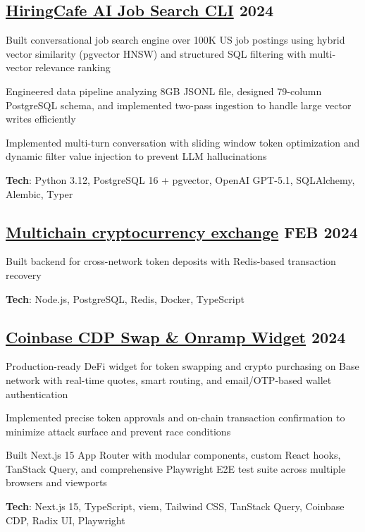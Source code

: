 \documentclass[letter,10pt]{article}
\begin{document}
\subsection{{ \href{https://github.com/Suhel-Kap/hiringcafe-dataset-job-search}{HiringCafe AI Job Search CLI} \hfill 2024}}
\begin{zitemize}
  \item Built conversational job search engine over 100K US job postings using hybrid vector similarity (pgvector HNSW) and structured SQL filtering with multi-vector relevance ranking
  \item Engineered data pipeline analyzing 8GB JSONL file, designed 79-column PostgreSQL schema, and implemented two-pass ingestion to handle large vector writes efficiently
  \item Implemented multi-turn conversation with sliding window token optimization and dynamic filter value injection to prevent LLM hallucinations
  \item \textbf{Tech}: Python 3.12, PostgreSQL 16 + pgvector, OpenAI GPT-5.1, SQLAlchemy, Alembic, Typer
\end{zitemize}

\subsection{{ \href{https://github.com/Suhel-Kap/crypto-exchanger}{Multichain cryptocurrency exchange} \hfill FEB 2024}}
\begin{zitemize}
  \item Built backend for cross-network token deposits with Redis-based transaction recovery
  \item \textbf{Tech}: Node.js, PostgreSQL, Redis, Docker, TypeScript
\end{zitemize}

\subsection{{ \href{https://github.com/Suhel-Kap/coinbase-swap-widget}{Coinbase CDP Swap \& Onramp Widget} \hfill 2024}}
\begin{zitemize}
  \item Production-ready DeFi widget for token swapping and crypto purchasing on Base network with real-time quotes, smart routing, and email/OTP-based wallet authentication
  \item Implemented precise token approvals and on-chain transaction confirmation to minimize attack surface and prevent race conditions
  \item Built Next.js 15 App Router with modular components, custom React hooks, TanStack Query, and comprehensive Playwright E2E test suite across multiple browsers and viewports
  \item \textbf{Tech}: Next.js 15, TypeScript, viem, Tailwind CSS, TanStack Query, Coinbase CDP, Radix UI, Playwright
\end{zitemize}
\end{document}
